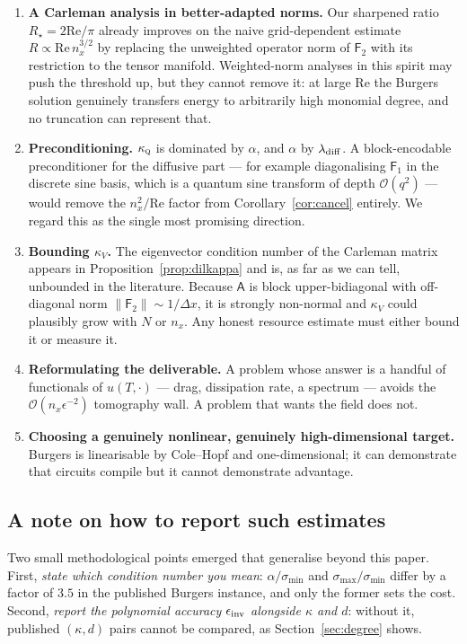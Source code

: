 \documentclass[11pt,a4paper]{article}
\theoremstyle{plain}
\theoremstyle{definition}
\theoremstyle{remark}
\newcommand{\Rey}{\mathrm{Re}}
\newcommand{\Oh}{\mathcal{O}}
\newcommand{\norm}[1]{\lVert #1 \rVert}
\newcommand{\Amat}{\mathsf{A}}
\newcommand{\Fone}{\mathsf{F}_1}
\newcommand{\Ftwo}{\mathsf{F}_2}
\newcommand{\kQ}{\kappa_{\textsc{q}}}
\begin{document}
\begin{enumerate}[leftmargin=*]
\item \textbf{A Carleman analysis in better-adapted norms.}  Our sharpened ratio
$R_\star=2\Rey/\pi$ already improves on the naive grid-dependent estimate
$R\propto\Rey\,n_x^{3/2}$ by replacing the unweighted operator norm of $\Ftwo$
with its restriction to the tensor manifold.  Weighted-norm analyses in this
spirit \cite{GonzalezConde2025,Wu2025} may push the threshold up, but they
cannot remove it: at large $\Rey$ the Burgers solution genuinely transfers energy
to arbitrarily high monomial degree, and no truncation can represent that.
\item \textbf{Preconditioning.}  $\kQ$ is dominated by $\alpha$, and $\alpha$ by
$\lambda_{\rm diff}$.  A block-encodable preconditioner for the diffusive part
--- for example diagonalising $\Fone$ in the discrete sine basis, which is a
quantum sine transform of depth $\Oh(q^2)$ --- would remove the $n_x^2/\Rey$
factor from Corollary~\ref{cor:cancel} entirely.  We regard this as the single
most promising direction.
\item \textbf{Bounding $\kappa_V$.}  The eigenvector condition number of the
Carleman matrix appears in Proposition~\ref{prop:dilkappa} and is, as far as we
can tell, unbounded in the literature.  Because $\Amat$ is block upper-bidiagonal
with off-diagonal norm $\norm{\Ftwo}\sim1/\Delta x$, it is strongly non-normal
and $\kappa_V$ could plausibly grow with $N$ or $n_x$.  Any honest resource
estimate must either bound it or measure it.
\item \textbf{Reformulating the deliverable.}  A problem whose answer is a
handful of functionals of $u(T,\cdot)$ --- drag, dissipation rate, a spectrum ---
avoids the $\Oh(n_x\epsilon^{-2})$ tomography wall.  A problem that wants the
field does not.
\item \textbf{Choosing a genuinely nonlinear, genuinely high-dimensional target.}
Burgers is linearisable by Cole--Hopf and one-dimensional; it can demonstrate
that circuits compile but it cannot demonstrate advantage.
\end{enumerate}

\subsection{A note on how to report such estimates}

Two small methodological points emerged that generalise beyond this paper.
First, \emph{state which condition number you mean}: $\alpha/\sigma_{\min}$ and
$\sigma_{\max}/\sigma_{\min}$ differ by a factor of $3.5$ in the published
Burgers instance, and only the former sets the cost.  Second, \emph{report the
polynomial accuracy $\epsilon_{\rm inv}$ alongside $\kappa$ and $d$}: without
it, published $(\kappa,d)$ pairs cannot be compared, as
Section~\ref{sec:degree} shows.
\end{document}
